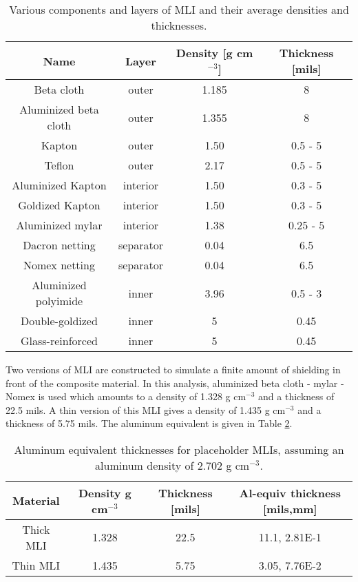 \documentclass{hitec}
\begin{document}
\begin{table}[h]\centering
	\caption{Various components and layers of MLI and their average densities and thicknesses.}\label{tab:MLI}
	\begin{tabular}{|c | c | c | c |}\hline
		Name & Layer & Density [g cm$^{-3}$] & Thickness [mils] \\\hline
		Beta cloth            & outer     & 1.185 & 8 \\\hline
		Aluminized beta cloth & outer     & 1.355 & 8 \\\hline
		Kapton                & outer     & 1.50  & 0.5 - 5 \\\hline
		Teflon                & outer     & 2.17  & 0.5 - 5 \\\hline
		Aluminized Kapton     & interior  & 1.50  & 0.3 - 5 \\\hline
		Goldized Kapton       & interior  & 1.50  & 0.3 - 5 \\\hline
		Aluminized mylar      & interior  & 1.38  & 0.25 - 5 \\\hline
		Dacron netting        & separator & 0.04  & 6.5 \\\hline
		Nomex netting         & separator & 0.04  & 6.5 \\\hline
		Aluminized polyimide  & inner     & 3.96  & 0.5 - 3 \\\hline
		Double-goldized       & inner     & 5     & 0.45 \\\hline
		Glass-reinforced      & inner     & 5     & 0.45 \\\hline
	\end{tabular}
\end{table}

Two versions of MLI are constructed to simulate a finite amount of shielding in front of the composite material. In this analysis, aluminized beta cloth - mylar - Nomex is used which amounts to a density of 1.328 g cm$^{-3}$ and a thickness of 22.5 mils. A thin version of this MLI gives a density of 1.435 g cm$^{-3}$ and a thickness of 5.75 mils. The aluminum equivalent is given in Table \ref{tab:al_equiv_MLI}.

\begin{table}[h]\centering
	\caption{Aluminum equivalent thicknesses for placeholder MLIs, assuming an aluminum density of 2.702 g cm$^{-3}$.}\label{tab:al_equiv_MLI}
	\begin{tabular}{|c | c | c | c |}\hline
		Material & Density g cm$^{-3}$ & Thickness [mils] & Al-equiv thickness [mils,mm] \\\hline
		Thick MLI  & 1.328 & 22.5 & 11.1, 2.81E-1 \\\hline
		Thin MLI   & 1.435 & 5.75 & 3.05, 7.76E-2   \\\hline
	\end{tabular}
\end{table}
\end{document}
